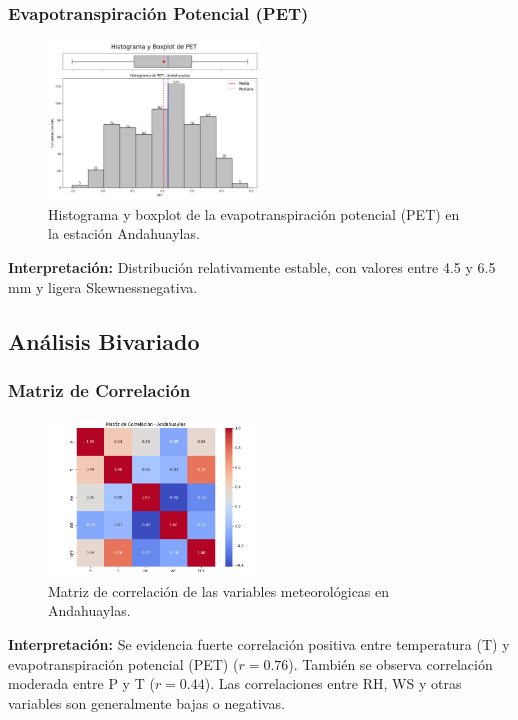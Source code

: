 \subsubsection*{Evapotranspiración Potencial (PET)}
\begin{figure}[H]
\centering
\includegraphics[width=0.5\textwidth]{resultados/por_estacion_meteorologica/Andahuaylas/PET_histograma.png}
\caption{Histograma y boxplot de la evapotranspiración potencial (PET) en la estación Andahuaylas.}
\label{fig:andahuaylas_PET}
\end{figure}
\textbf{Interpretación:} Distribución relativamente estable, con valores entre 4.5 y 6.5 mm y ligera Skewnessnegativa.

\subsection{Análisis Bivariado}

\subsubsection*{Matriz de Correlación}
\begin{figure}[H]
\centering
\includegraphics[width=0.5\textwidth]{resultados/por_estacion_meteorologica/Andahuaylas/matriz_correlacion.png}
\caption{Matriz de correlación de las variables meteorológicas en Andahuaylas.}
\label{fig:andahuaylas_corr}
\end{figure}
\textbf{Interpretación:} Se evidencia fuerte correlación positiva entre temperatura (T) y evapotranspiración potencial (PET) (\(r = 0.76\)). También se observa correlación moderada entre P y T (\(r = 0.44\)). Las correlaciones entre RH, WS y otras variables son generalmente bajas o negativas.

